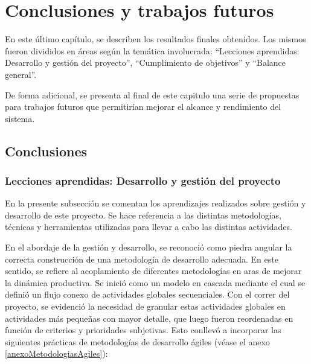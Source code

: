 \chapter{Conclusiones y trabajos futuros}
\par
En este último capítulo, se describen los resultados finales obtenidos. Los mismos fueron divididos en áreas según la temática involucrada: ``Lecciones aprendidas: Desarrollo y gestión del proyecto'', ``Cumplimiento de objetivos'' y ``Balance general''. 
\par De forma adicional, se presenta al final de este capitulo una serie de propuestas para trabajos futuros que permitirían mejorar el alcance y rendimiento del sistema.

\section{Conclusiones} 
    \subsection{Lecciones aprendidas: Desarrollo y gestión del proyecto}
        \par En la presente subsección se comentan los aprendizajes realizados sobre gestión y desarrollo de este proyecto. Se hace referencia a las distintas metodologías, técnicas y herramientas utilizadas para llevar a cabo las distintas actividades.
        
        \par En el abordaje de la gestión y desarrollo, se reconoció como piedra angular la correcta construcción de una metodología de desarrollo adecuada. En este sentido, se refiere al acoplamiento de diferentes metodologías en aras de mejorar la dinámica productiva. Se inició como un modelo en cascada mediante el cual se definió un flujo conexo de actividades globales secuenciales. Con el correr del proyecto, se evidenció la necesidad de granular estas actividades globales en actividades más pequeñas con mayor detalle, que luego fueron reordenadas en función de criterios y prioridades subjetivas. Esto conllevó a incorporar las siguientes prácticas de metodologías de desarrollo ágiles (véase el anexo \ref{anexoMetodologiasAgiles}):
        
